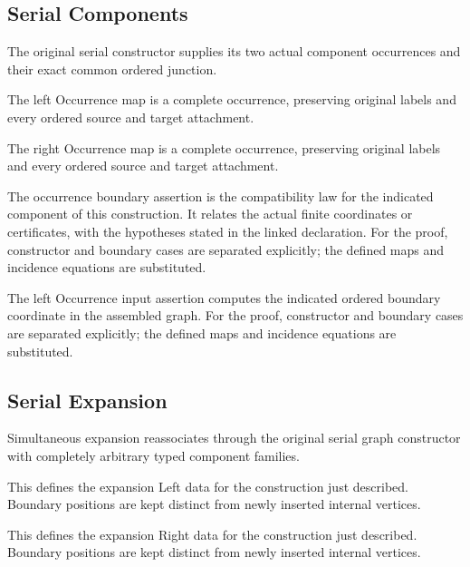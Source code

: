 \subsection{Serial Components}
The original serial constructor supplies its two actual component occurrences and their exact common ordered junction.

The left Occurrence map is a complete occurrence, preserving original labels and every ordered source and target attachment.
\par{}

The right Occurrence map is a complete occurrence, preserving original labels and every ordered source and target attachment.
\par{}

The occurrence boundary assertion is the compatibility law for the indicated component of this construction. It relates the actual finite coordinates or certificates, with the hypotheses stated in the linked declaration.
For the proof, constructor and boundary cases are separated explicitly; the defined maps and incidence equations are substituted.
\par{}

The left Occurrence input assertion computes the indicated ordered boundary coordinate in the assembled graph.
For the proof, constructor and boundary cases are separated explicitly; the defined maps and incidence equations are substituted.
\par{}

\subsection{Serial Expansion}
Simultaneous expansion reassociates through the original serial graph constructor with completely arbitrary typed component families.

This defines the expansion Left data for the construction just described. Boundary positions are kept distinct from newly inserted internal vertices.
\par{}

This defines the expansion Right data for the construction just described. Boundary positions are kept distinct from newly inserted internal vertices.
\par{}

